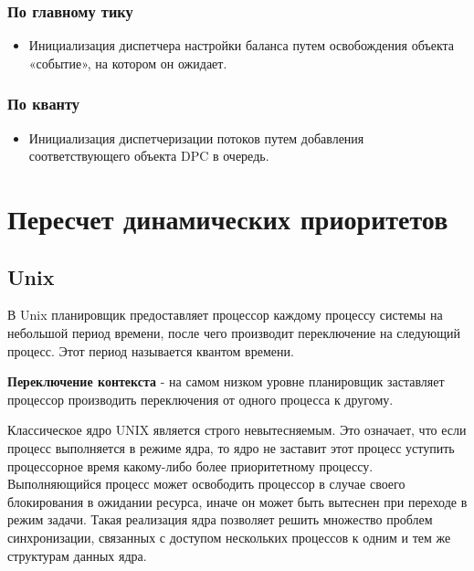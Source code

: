 \documentclass[12pt]{report}
\begin{document}
\subsection{По главному тику}
\begin{itemize}
	\item Инициализация диспетчера настройки баланса путем освобождения объекта «событие», на котором он ожидает.

\end{itemize}
\subsection{По кванту}
\begin{itemize}
	\item Инициализация диспетчеризации потоков путем добавления соответствующего объекта DPC в очередь.
\end{itemize}

\chapter{Пересчет динамических приоритетов}
\section{Unix}
В Unix планировщик предоставляет процессор каждому процессу системы на небольшой период времени, после чего производит переключение на следующий процесс. Этот период называется квантом времени.

\textbf{Переключение контекста} - на самом низком уровне планировщик заставляет процессор производить переключения от одного процесса к другому.

Классическое ядро UNIX является строго невытесняемым. Это означает, что если процесс выполняется в режиме ядра, то ядро не заставит этот процесс уступить процессорное время какому-либо более приоритетному процессу. Выполняющийся процесс может освободить процессор в случае своего блокирования в ожидании ресурса, иначе он может быть вытеснен при переходе в режим задачи. Такая реализация ядра позволяет решить множество проблем синхронизации, связанных с доступом нескольких процессов к одним и тем же структурам данных ядра.
\end{document}
